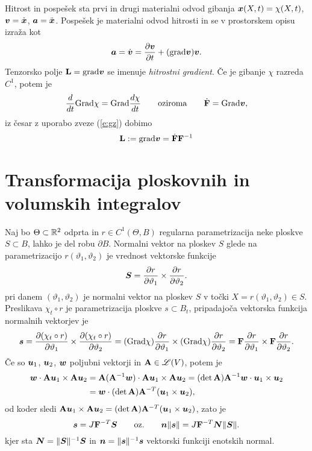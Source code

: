 \begin{primer} %
	Hitrost in pospešek sta prvi in drugi materialni odvod gibanja $\boldsymbol x(X,t)=\chi(X,t)$,
	$\boldsymbol v=\dot{\boldsymbol x}$, $\boldsymbol a=\ddot{\boldsymbol x}$.
	Pospešek je materialni odvod hitrosti in se v prostorskem opisu izraža kot
	\[ \boldsymbol a=\dot{\boldsymbol v}=\frac{\partial\boldsymbol v}{\partial t}+(\mathrm{grad}\boldsymbol v)\boldsymbol v. \]
	Tenzorsko polje $\mathbf L=\mathrm{grad}\boldsymbol v$ se imenuje \emph{hitrostni gradient}.
	Če je gibanje $\chi$ razreda $C^1$, potem je
	\[
		\frac{d}{dt}\mathrm{Grad}\chi=\mathrm{Grad}\frac{d\chi}{dt}\qquad\textrm{oziroma}\qquad
		\dot{\mathbf F}=\mathrm{Grad}\boldsymbol v,
	\]
	iz česar z uporabo zveze (\ref{e:gz}) dobimo
	\begin{equation} \label{e:L}
		\mathbf L:=\mathrm{grad}\boldsymbol v=\dot{\mathbf F}\mathbf F^{-1}
	\end{equation}
\end{primer}


\section{Transformacija ploskovnih in volumskih integralov}


Naj bo $\Theta\subset\mathbb R^2$ odprta in $r\in C^1(\Theta,B)$ regularna parametrizacija
neke ploskve $S\subset B$, lahko je del robu $\partial B$. Normalni vektor
na ploskev $S$ glede na parametrizacijo $r(\vartheta_1,\vartheta_2)$ je
vrednost vektorske funkcije
\[
	\boldsymbol S=\frac{\partial r}{\partial\vartheta_1}\times
	\frac{\partial r}{\partial\vartheta_2}.
\]
pri danem $(\vartheta_1,\vartheta_2)$ je normalni vektor na ploskev $S$
v točki $X=r(\vartheta_1,\vartheta_2)\in S$.
Preslikava $\chi_t\circ r$ je parametrizacija ploskve $s\subset B_t$, pripadajoča
vektorska funkcija normalnih vektorjev je
\[
	\boldsymbol s=\frac{\partial(\chi_t\circ r)}{\partial\vartheta_1}\times
	\frac{\partial(\chi_t\circ r)}{\partial\vartheta_2}=
	(\mathrm{Grad}\chi)\frac{\partial r}{\partial\vartheta_1}\times
	(\mathrm{Grad}\chi)\frac{\partial r}{\partial\vartheta_2}=
	\mathbf F\frac{\partial r}{\partial\vartheta_1}\times
	\mathbf F\frac{\partial r}{\partial\vartheta_2}.
\]
Če so $\boldsymbol u_1$, $\boldsymbol u_2$, $\boldsymbol w$ poljubni vektorji in $\mathbf A\in\mathscr L(V)$, potem je
\begin{align*}
	\boldsymbol w\cdot\mathbf A\boldsymbol u_1\times\mathbf A\boldsymbol u_2&=
	\mathbf A(\mathbf A^{-1}\boldsymbol w)\cdot\mathbf A\boldsymbol u_1\times\mathbf A\boldsymbol u_2=
	(\det\mathbf A)\mathbf A^{-1}\boldsymbol w\cdot\boldsymbol u_1\times\boldsymbol u_2 \\
	&=\boldsymbol w\cdot (\det\mathbf A)\mathbf A^{-T}(\boldsymbol u_1\times\boldsymbol u_2),
\end{align*}
od koder sledi $\mathbf A\boldsymbol u_1\times\mathbf A\boldsymbol u_2=
(\det\mathbf A)\mathbf A^{-T}(\boldsymbol u_1\times\boldsymbol u_2)$, zato je
\begin{equation} \label{e:nsns}
	\boldsymbol s=J\mathbf F^{-T}\boldsymbol S\qquad\textrm{oz.}\qquad
	\boldsymbol n\|\boldsymbol s\|=J\mathbf F^{-T}\boldsymbol N\|\boldsymbol S\|.
\end{equation}
kjer sta $\boldsymbol N=\|\boldsymbol S\|^{-1}\boldsymbol S$ in $\boldsymbol n=\|\boldsymbol s\|^{-1}\boldsymbol s$
vektorski funkciji enotskih normal.

